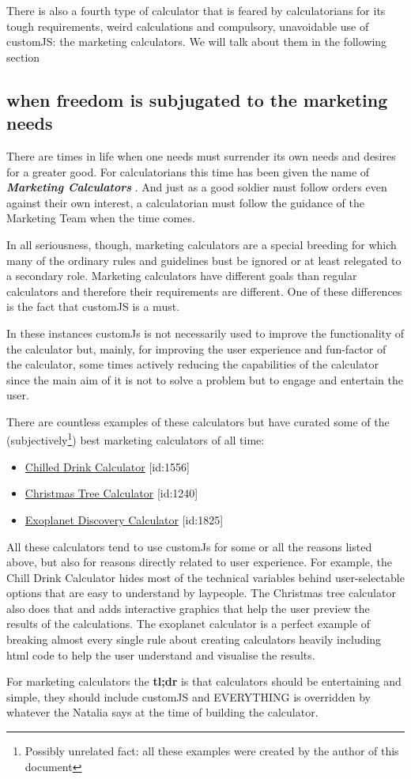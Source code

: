 There is also a fourth type of calculator that is feared by calculatorians for its tough requirements, weird calculations and compulsory, unavoidable use of customJS: the marketing calculators. We will talk about them in the following section

\subsection{when freedom is subjugated to the marketing needs}
\label{sub:marketing}
There are times in life when one needs must surrender its own needs and desires for a greater good. For calculatorians this time has been given the name of \textbf{\textit{Marketing Calculators}} . And just as a good soldier must follow orders even against their own interest, a calculatorian must follow the guidance of the Marketing Team when the time comes. 

In all seriousness, though, marketing calculators are a special breeding for which many of the ordinary rules and guidelines bust be ignored or at least relegated to a secondary role. Marketing calculators have different goals than regular calculators and therefore their requirements are different. One of these differences is the fact that customJS is a must. 

In these instances customJs is not necessarily used to improve the functionality of the calculator but, mainly, for improving the user experience and fun-factor of the calculator, some times actively reducing the capabilities of the calculator since the main aim of it is not to solve a problem but to engage and entertain the user. 

There are countless examples of these calculators but have curated some of the (subjectively\footnote{Possibly unrelated fact: all these examples were created by the author of this document}) best marketing calculators of all time:
\begin{itemize}
    \item \href{https://www.omnicalculator.com/all/chilled-drink}{Chilled Drink Calculator} [id:1556]
    \item \href{https://www.omnicalculator.com/all/christmas-tree}{Christmas Tree Calculator} [id:1240]
    \item \href{https://www.omnicalculator.com/all/exoplanet}{Exoplanet Discovery Calculator} [id:1825]
\end{itemize}

All these calculators tend to use customJs for some or all the reasons listed above, but also for reasons directly related to user experience. For example, the Chill Drink Calculator hides most of the technical variables behind user-selectable options that are easy to understand by laypeople. The Christmas tree calculator also does that and adds interactive graphics that help the user preview the results of the calculations. The exoplanet calculator is a perfect example of breaking almost every single rule about creating calculators heavily including html code to help the user understand and visualise the results.

    For marketing calculators the \textbf{tl;dr} is that calculators should be entertaining and simple, they should include customJS and EVERYTHING is overridden by whatever the Natalia says at the time of building the calculator.

